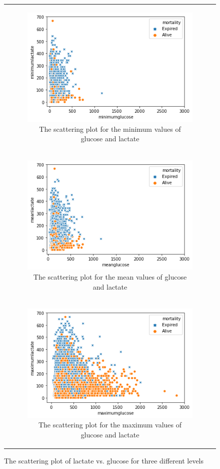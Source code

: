 \begin{figure}[H]
\begin{tabular}{@{}c@{}}
\begin{subfigure}{1\textwidth}
  \centering
  \includegraphics[width=10cm]{fig/chapter4/Glu-Lac, Min.png}
  \caption{\footnotesize{The scattering plot for the minimum values of glucose and lactate}}
  \label{fig:gluclactmin}
\end{subfigure} \\
\begin{subfigure}{1\textwidth}
  \centering
  \includegraphics[width=10cm]{fig/chapter4/Glu-Lac, Mean.png}
  \caption{\footnotesize{The scattering plot for the mean values of glucose and lactate}}
  \label{fig:gluclactmean}
\end{subfigure} \\
\begin{subfigure}{1\textwidth}
  \centering
  \includegraphics[width=10cm]{fig/chapter4/Glu-Lac, Max.png}
  \caption{\footnotesize{The scattering plot for the maximum values of glucose and lactate}}
  \label{fig:gluclactmax}
\end{subfigure} \\
\end{tabular}
\caption{The scattering plot of lactate vs. glucose for three different levels}
\label{fig:gluclact}
\end{figure}

